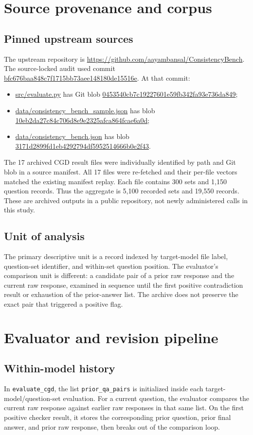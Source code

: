 \documentclass[11pt]{article}
\begin{document}
\section{Source provenance and corpus}
\subsection{Pinned upstream sources}
The upstream repository is \url{https://github.com/aayambansal/ConsistencyBench}. The source-locked audit used commit \url{bfc676baa848c7f1715bb73aee148180de15516e}. At that commit:
\begin{itemize}
  \item \url{src/evaluate.py} has Git blob \url{0453540cb7c19227601e59fb342fa93e736da849};
  \item \url{data/consistency_bench_sample.json} has blob \url{10eb2da27c84c706d8e9e2325afca864fcae6a0d};
  \item \url{data/consistency_bench.json} has blob \url{3171d2899fd1eb4292794df5952514666b0e2f43}.
\end{itemize}
The 17 archived CGD result files were individually identified by path and Git blob in a source manifest. All 17 files were re-fetched and their per-file vectors matched the existing manifest replay. Each file contains 300 sets and 1,150 question records. Thus the aggregate is 5,100 recorded sets and 19,550 records. These are archived outputs in a public repository, not newly administered calls in this study.

\subsection{Unit of analysis}
The primary descriptive unit is a record indexed by target-model file label, question-set identifier, and within-set question position. The evaluator's comparison unit is different: a candidate pair of a prior raw response and the current raw response, examined in sequence until the first positive contradiction result or exhaustion of the prior-answer list. The archive does not preserve the exact pair that triggered a positive flag.

\section{Evaluator and revision pipeline}
\subsection{Within-model history}
In \texttt{evaluate\_cgd}, the list \texttt{prior\_qa\_pairs} is initialized inside each target-model/question-set evaluation. For a current question, the evaluator compares the current raw response against earlier raw responses in that same list. On the first positive checker result, it stores the corresponding prior question, prior final answer, and prior raw response, then breaks out of the comparison loop.
\end{document}
